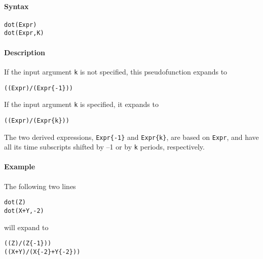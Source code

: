 


	\paragraph{Syntax}

\begin{verbatim}
dot(Expr)
dot(Expr,K)
\end{verbatim}

\paragraph{Description}

If the input argument \texttt{k} is not specified, this pseudofunction
expands to

\begin{verbatim}
((Expr)/(Expr{-1}))
\end{verbatim}

If the input argument \texttt{k} is specified, it expands to

\begin{verbatim}
((Expr)/(Expr{k}))
\end{verbatim}

The two derived expressions, \texttt{Expr\{-1\}} and \texttt{Expr\{k\}},
are based on \texttt{Expr}, and have all its time subscripts shifted by
--1 or by \texttt{k} periods, respectively.

\paragraph{Example}

The following two lines

\begin{verbatim}
dot(Z)
dot(X+Y,-2)
\end{verbatim}

will expand to

\begin{verbatim}
((Z)/(Z{-1}))
((X+Y)/(X{-2}+Y{-2}))
\end{verbatim}


